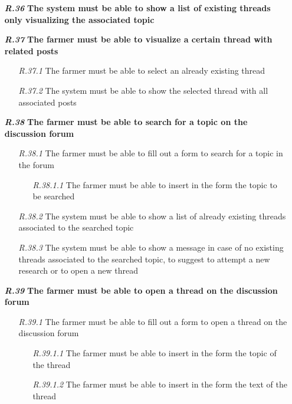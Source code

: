 \begin{itemize}
        \item [\textbf{\textit{R.36}}] \textbf{The system must be able to show a list of existing threads only visualizing the associated topic}
        \item [\textbf{\textit{R.37}}] \textbf{The farmer must be able to visualize a certain thread with related posts}
        \begin{itemize}
            \item [\textit{R.37.1}] The farmer must be able to select an already existing thread
	        \item [\textit{R.37.2}] The system must be able to show the selected thread with all associated posts
        \end{itemize}
        \item [\textbf{\textit{R.38}}] \textbf{The farmer must be able to search for a topic on the discussion forum}
        \begin{itemize}
        \item [\textit{R.38.1}] The farmer must be able to fill out a form to search for a topic in the forum
            \begin{itemize}
                \item [\textit{R.38.1.1}] The farmer must be able to insert in the form the topic to be searched
            \end{itemize}
        \item [\textit{R.38.2}] The system must be able to show a list of already existing threads associated to the searched topic
        \item [\textit{R.38.3}] The system must be able to show a message in case of no existing threads associated to the searched topic, to suggest to attempt a new research or to open a new thread
        \end{itemize}
        \item [\textbf{\textit{R.39}}] \textbf{The farmer must be able to open a thread on the discussion forum}
        \begin{itemize}
            \item [\textit{R.39.1}] The farmer must be able to fill out a form to open a thread on the discussion forum
            \begin{itemize}
                \item [\textit{R.39.1.1}] The farmer must be able to insert in the form the topic of the thread
                \item [\textit{R.39.1.2}] The farmer must be able to insert in the form the text of the thread

\end{itemize}
\end{itemize}
\end{itemize}
